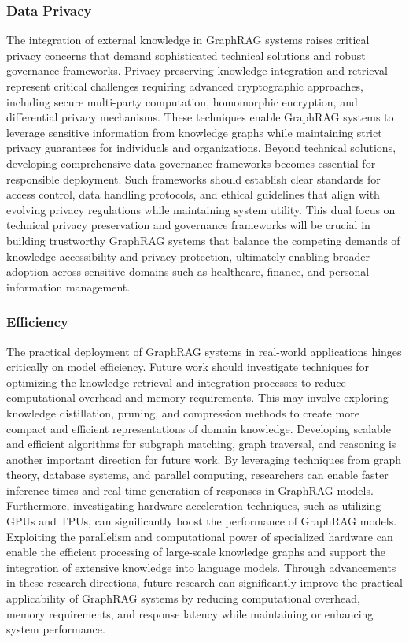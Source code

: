 \documentclass[lettersize,journal]{IEEEtran}
\begin{document}
\subsubsection{Data Privacy}
The integration of external knowledge in GraphRAG systems raises critical privacy concerns that demand sophisticated technical solutions and robust governance frameworks. Privacy-preserving knowledge integration and retrieval represent critical challenges requiring advanced cryptographic approaches, including secure multi-party computation, homomorphic encryption, and differential privacy mechanisms. These techniques enable GraphRAG systems to leverage sensitive information from knowledge graphs while maintaining strict privacy guarantees for individuals and organizations. Beyond technical solutions, developing comprehensive data governance frameworks becomes essential for responsible deployment. Such frameworks should establish clear standards for access control, data handling protocols, and ethical guidelines that align with evolving privacy regulations while maintaining system utility. This dual focus on technical privacy preservation and governance frameworks will be crucial in building trustworthy GraphRAG systems that balance the competing demands of knowledge accessibility and privacy protection, ultimately enabling broader adoption across sensitive domains such as healthcare, finance, and personal information management.


\subsubsection{Efficiency}
The practical deployment of GraphRAG systems in real-world applications hinges critically on model efficiency. Future work should investigate techniques for optimizing the knowledge retrieval and integration processes to reduce computational overhead and memory requirements. This may involve exploring knowledge distillation, pruning, and compression methods to create more compact and efficient representations of domain knowledge. Developing scalable and efficient algorithms for subgraph matching, graph traversal, and reasoning is another important direction for future work. By leveraging techniques from graph theory, database systems, and parallel computing, researchers can enable faster inference times and real-time generation of responses in GraphRAG models. Furthermore, investigating hardware acceleration techniques, such as utilizing GPUs and TPUs, can significantly boost the performance of GraphRAG models. Exploiting the parallelism and computational power of specialized hardware can enable the efficient processing of large-scale knowledge graphs and support the integration of extensive knowledge into language models. Through advancements in these research directions, future research can significantly improve the practical applicability of GraphRAG systems by reducing computational overhead, memory requirements, and response latency while maintaining or enhancing system performance.
\end{document}
